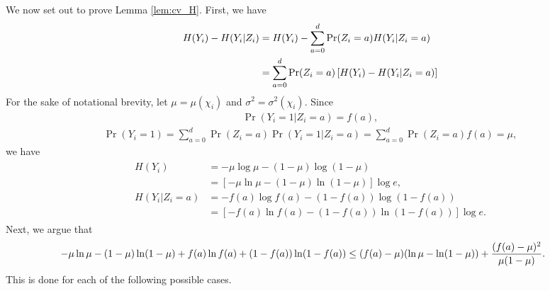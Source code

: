 \documentclass[onecolumn,letterpaper]{IEEEtran}
\newcommand{\cy}{{Y}}
\newcommand{\etp}{{H}}
\newcommand{\cA}{{Z}}
\newcommand{\na}{{a}}
\newcommand{\plsize}{{\chi}}
\newcommand{\mean}{{\mu}}
\newcommand{\var}{{\sigma^{2}}}
\begin{document}
We now set out to prove Lemma \ref{lem:cv_H}. First, we have
\begin{align}
\label{eq:cv:maxH}
   \etp(\cy_i) - \etp(\cy_i|\cA_i)&= \etp(\cy_i) - \sum\limits_{\na=0}^{d} \Pr(\cA_i=\na) \etp(\cy_i | \cA_i=\na) \notag\\
    &= \sum\limits_{\na=0}^{d} \Pr(\cA_i=\na) \left[\etp(\cy_i) - \etp(\cy_i | \cA_i=\na)\right]
\end{align}
For the sake of notational brevity, let $\mean=\mean(\plsize_i)$ and $\var=\var(\plsize_i)$. Since 
\begin{align*}
\Pr (\cy_i = 1|\cA_i=\na) =f(a),
\end{align*}
\begin{align*}
\Pr (\cy_i = 1)=\sum\limits_{\na=0}^{d} \Pr(\cA_i=\na)\Pr (\cy_i = 1|\cA_i=\na) =\sum\limits_{\na=0}^{d} \Pr(\cA_i=\na)f(a)=\mean,
\end{align*}
we have
\begin{align}
\label{eq:H(Y_i):H(Y_i|Z_i=a)}
\begin{aligned}
     \etp(\cy_i) &= -\mean \log \mean - (1-\mean) \log (1-\mean) \\
                 &=\left[-\mean \ln \mean - (1-\mean) \ln (1-\mean)\right]\log e, \\
     \etp(\cy_i | \cA_i=\na) &= - f(\na) \log f(\na) - (1-f(\na)) \log (1-f(\na))\\
     &= \left[- f(\na) \ln f(\na) - (1-f(\na)) \ln (1-f(\na))\right]\log e.
\end{aligned}
\end{align}
Next, we argue that 
\begin{align}
\label{upb:H(Y_i)-H(Y_i|Z_i=a)}
\kern-.5em     -\mean \ln \mean - (1-\mean) \ln (1-\mean) + f(\na) \ln f(\na) + (1-f(\na)) \ln (1-f(\na)) 
    &\leq (f(\na)-\mean) (\ln \mean - \ln(1-\mean)) + \frac{(f(\na)-\mean)^2}{\mean(1-\mean)}.
\end{align}
This is done for each of the following possible cases.
\end{document}
